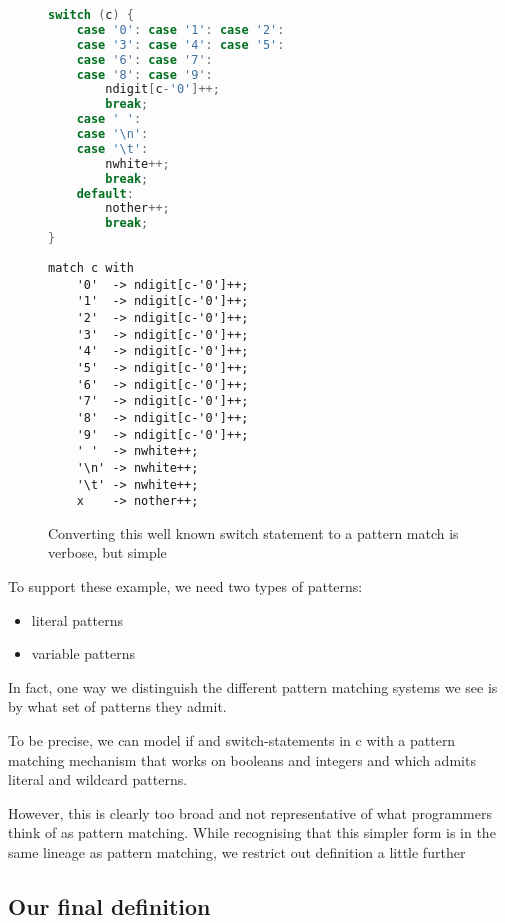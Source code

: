 \documentclass[acmsmall]{acmart}
\begin{document}
\begin{figure}
\begin{minipage}[t]{0.45\linewidth}
\begin{lstlisting}[language=C]
switch (c) {
    case '0': case '1': case '2': 
    case '3': case '4': case '5': 
    case '6': case '7': 
    case '8': case '9':
        ndigit[c-'0']++;
        break;
    case ' ': 
    case '\n': 
    case '\t':
        nwhite++;
        break;
    default:
        nother++;
        break;
}
\end{lstlisting}
\end{minipage}
\begin{minipage}[t]{0.45\linewidth}
\begin{lstlisting}
match c with
    '0'  -> ndigit[c-'0']++;
    '1'  -> ndigit[c-'0']++;
    '2'  -> ndigit[c-'0']++;
    '3'  -> ndigit[c-'0']++;
    '4'  -> ndigit[c-'0']++;
    '5'  -> ndigit[c-'0']++;
    '6'  -> ndigit[c-'0']++;
    '7'  -> ndigit[c-'0']++;
    '8'  -> ndigit[c-'0']++;
    '9'  -> ndigit[c-'0']++;
    ' '  -> nwhite++;
    '\n' -> nwhite++;
    '\t' -> nwhite++;
    x    -> nother++;
\end{lstlisting}
\end{minipage}
\caption{Converting this well known switch statement \cite{kernighan_c_1988} to a pattern match is verbose, but simple}
\label{fig:kar_switch}
\end{figure}

To support these example, we need two types of patterns:
\begin{itemize}
    \item literal patterns
    \item variable patterns
\end{itemize}

In fact, one way we distinguish the different pattern matching systems we see is by what set of patterns they admit.

To be precise, we can model if and switch-statements in c with a pattern matching mechanism that works on booleans and integers and which admits literal and wildcard patterns.

However, this is clearly too broad and not representative of what programmers think of as pattern matching. While recognising that this simpler form is in the same lineage as pattern matching, we restrict out definition a little further

\subsection{Our final definition}
\end{document}

